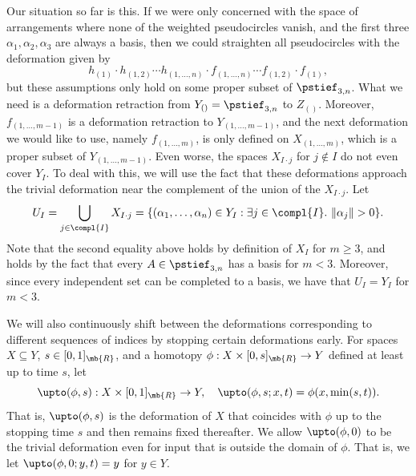 Our situation so far is this.
If we were only concerned with the space of arrangements where none of the weighted pseudocircles vanish, and the first three $\alpha_1,\alpha_2,\alpha_3$ are always a basis, then we could straighten all pseudocircles with the deformation given by
\begin{equation}\label{deformation-naive}
h_{(1)} \cdot h_{(1,2)} \cdots h_{(1,\dots,n)} \cdot f_{(1,\dots,n)} \cdots f_{(1,2)} \cdot f_{(1)},
\end{equation}
but these assumptions only hold on some proper subset of $\pstief_{3,n}$.
What we need is a deformation retraction from $Y_{()} = \pstief_{3,n}$ to $Z_{()}$.
Moreover, $f_{(1,\dots,{m-1})}$ is a defor\-mation retraction to $Y_{(1,\dots,{m-1})}$, and the next deformation we would like to use, namely $f_{(1,\dots,m)}$, is only defined on $X_{(1,\dots,m)}$, which is a proper subset of $Y_{(1,\dots,{m-1})}$.
Even worse, the spaces $X_{I\cdot j}$ for $j \not\in I$ do not even cover $Y_I$.
To deal with this, we will use the fact that these deformations approach the trivial deformation near the complement of the union of the $X_{I\cdot j}$.
Let
\[ U_I = \bigcup_{j\in\compl{I}} X_{I\cdot j}
=\{ (\alpha_1,\dots,\alpha_n) \in Y_I:\exists j \in \compl{I}.\ \|\alpha_j\| > 0\}. \]
Note that the second equality above holds by definition of $X_I$ for $m \geq 3$, and holds by the fact that every $A \in \pstief_{3,n}$ has a basis for $m <3$.
Moreover, since every independent set can be completed to a basis, we have that $U_I = Y_I$ for $m < 3$.

We will also continuously shift between the deformations corresponding to different sequences of indices by stopping certain deformations early.
For spaces $X \subseteq Y$, \hbox{$s \in [0,1]_\mb{R}$}, and a homotopy $\phi:X \times [0,s]_\mb{R} \to Y$ defined at least up to time $s$, let
\[ \upto(\phi,s) : X \times [0,1]_\mb{R} \to Y, \quad \upto(\phi,s;x,t) = \phi(x,\min(s,t)). \]
That is, $\upto(\phi,s)$ is the deformation of $X$ that coincides with $\phi$ up to the stopping time $s$ and then remains fixed thereafter.
We allow $\upto(\phi,0)$ to be the trivial deformation even for input that is outside the domain of $\phi$.
That is, we let $\upto(\phi,0; y,t) = y$ for $y \in Y$.

